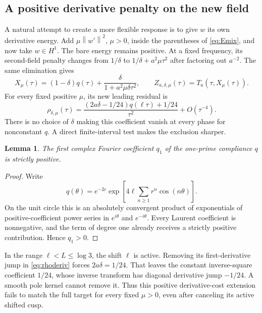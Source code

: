 \documentclass[11pt]{article}
\numberwithin{equation}{section}
\newtheorem{lemma}[theorem]{Lemma}
\theoremstyle{definition}
\theoremstyle{remark}
\newcommand{\norm}[1]{\left\lVert#1\right\rVert}
\begin{document}
\subsection{A positive derivative penalty on the new field}
A natural attempt to create a more flexible response is to give $w$ its own derivative energy. Add $\mu\norm{w'}^2$, $\mu>0$, inside the parentheses of \eqref{eq:Emix}, and now take $w\in H^1$. The bare energy remains positive. At a fixed frequency, its second-field penalty changes from $1/\delta$ to $1/\delta+a^2\mu\tau^2$ after factoring out $a^{-2}$. The same elimination gives
\begin{equation}
 X_\mu(\tau)=(1-\delta)q(\tau)
 +\frac{\delta}{1+a^2\mu\delta\tau^2},
 \qquad Z_{a,\delta,\mu}(\tau)=T_a(\tau,X_\mu(\tau)).
 \label{eq:Xmu}
\end{equation}
For every fixed positive $\mu$, its new leading residual is
\begin{equation}
 \rho_{\delta,\mu}(\tau)=
 \frac{(2a\delta-1/24)q(\ell\tau)+1/24}{\tau^2}
 +O(\tau^{-4}).
 \label{eq:rhoderiv}
\end{equation}
There is no choice of $\delta$ making this coefficient vanish at every phase for nonconstant $q$. A direct finite-interval test makes the exclusion sharper.

\begin{lemma}
The first complex Fourier coefficient $q_1$ of the one-prime compliance $q$ is strictly positive.
\end{lemma}
\begin{proof}
Write
\begin{equation}
 q(\theta)=e^{-2c}\exp\left[4\ell\sum_{n\ge1}r^n\cos(n\theta)\right].
\end{equation}
On the unit circle this is an absolutely convergent product of exponentials of positive-coefficient power series in $e^{i\theta}$ and $e^{-i\theta}$. Every Laurent coefficient is nonnegative, and the term of degree one already receives a strictly positive contribution. Hence $q_1>0$.
\end{proof}
In the range $\ell<L\le\log3$, the shift $\ell$ is active. Removing its first-derivative jump in \eqref{eq:rhoderiv} forces $2a\delta=1/24$. That leaves the constant inverse-square coefficient $1/24$, whose inverse transform has diagonal derivative jump $-1/24$. A smooth pole kernel cannot remove it. Thus this positive derivative-cost extension fails to match the full target for every fixed $\mu>0$, even after canceling its active shifted cusp.
\end{document}
